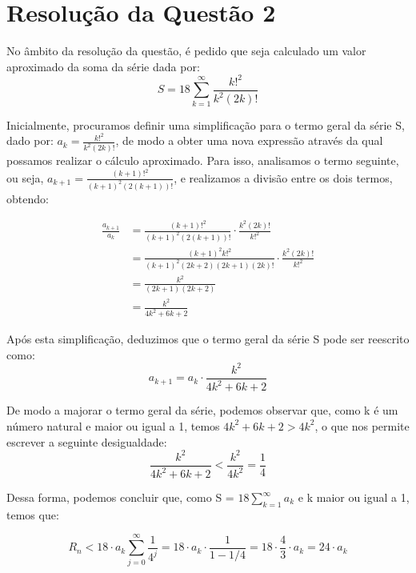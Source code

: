 \documentclass{article}
\begin{document}
\section{Resolução da Questão 2}
\smallskip

No âmbito da resolução da questão, é pedido que seja calculado um valor aproximado da soma da série dada por:
\begin{equation}
    S = 18 \sum_{k=1}^{\infty} \frac{k!^2}{k^2 (2k)!}
\end{equation}
\bigskip

Inicialmente, procuramos definir uma simplificação para o termo geral da série S, dado por: $a_k = \frac{k!^2}{k^2 (2k)!}$, de modo a obter uma nova expressão através da qual possamos realizar o cálculo aproximado. Para isso, analisamos o termo seguinte, ou seja, $a_{k+1} = \frac{(k+1)!^2}{(k+1)^2 (2(k+1))!}$, e realizamos a divisão entre os dois termos, obtendo:

\begin{align*}
    \frac{a_{k+1}}{a_k} &= \frac{(k+1)!^2}{(k+1)^2 (2(k+1))!} \cdot \frac{k^2 (2k)!}{k!^2} \\
    &= \frac{(k+1)^2 k!^2}{(k+1)^2 (2k+2)(2k+1)(2k)!} \cdot \frac{k^2 (2k)!}{k!^2} \\
    &= \frac{k^2}{(2k+1)(2k+2)} \\
    &= \frac{k^2}{4k^2 + 6k + 2}
\end{align*}
\bigskip

Após esta simplificação, deduzimos que o termo geral da série S pode ser reescrito como:
\begin{equation}
    a_{k+1} = a_k \cdot \frac{k^2}{4k^2 + 6k + 2}
\end{equation}
\medskip

De modo a majorar o termo geral da série, podemos observar que, como k é um número natural e maior ou igual a 1, temos $4k^2 + 6k + 2 > 4k^2$, o que nos permite escrever a seguinte desigualdade:
\begin{equation}
    \frac{k^2}{4k^2 + 6k + 2} < \frac{k^2}{4k^2} = \frac{1}{4}
\end{equation}
\bigskip

Dessa forma, podemos concluir que, como S = $18 \sum_{k=1}^{\infty} a_k$ e k maior ou igual a 1, temos que:
\smallskip

\begin{equation}
    R_n < 18 \cdot a_k \sum_{j=0}^{\infty} \frac{1}{4^j} = 18 \cdot a_k \cdot \frac{1}{1 - 1/4} = 18 \cdot \frac{4}{3} \cdot a_k = 24 \cdot a_k
\end{equation}
\bigskip   
\end{document}
